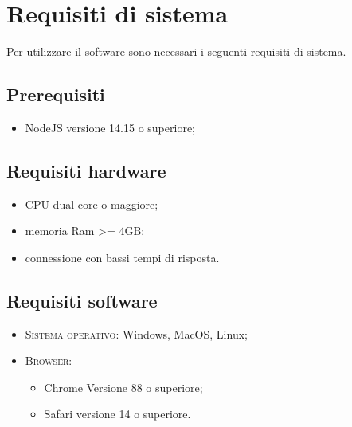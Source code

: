 \section{Requisiti di sistema}
Per utilizzare il software sono necessari i seguenti requisiti di sistema.
\subsection{Prerequisiti}
    \begin{itemize}
        \item NodeJS versione 14.15 o superiore;
    \end{itemize}
\subsection{Requisiti hardware}
\begin{itemize}
	\item CPU dual-core o maggiore;
	\item memoria Ram >= 4GB;
	\item connessione con bassi tempi di risposta.
\end{itemize}
\subsection{Requisiti software}
\begin{itemize}
    \item \textsc{Sistema operativo}: Windows, MacOS, Linux;
    \item \textsc{Browser}: 
    \begin{itemize}
        \item Chrome Versione 88 o superiore;
        \item Safari versione 14 o superiore.
    \end{itemize}
\end{itemize}